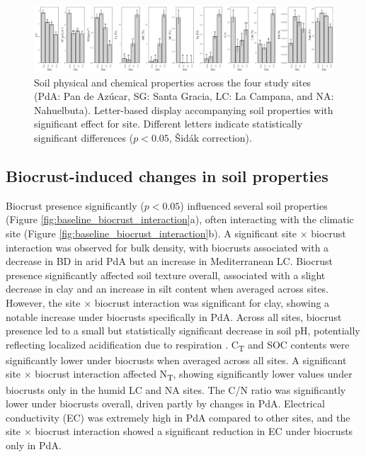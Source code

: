 \begin{figure}
    \centering
    \includegraphics[width=1\textwidth]{img/baseline_by_site.png}
    \caption[Soil physical and chemical properties across the four study sites]{Soil physical and chemical properties across the four study sites (PdA: Pan de Azúcar, SG: Santa Gracia, LC: La Campana, and NA: Nahuelbuta). Letter-based display accompanying soil properties with significant effect for site. Different letters indicate statistically significant differences ($p < 0.05$, Šidák correction).}
    \label{fig:baseline_site}
\end{figure}

\FloatBarrier

\subsection{Biocrust-induced changes in soil properties}
\label{sec:BicorustInducedSoil}

Biocrust presence significantly ($p < 0.05$) influenced several soil properties (Figure \ref{fig:baseline_biocrust_interaction}a), often interacting with the climatic site (Figure \ref{fig:baseline_biocrust_interaction}b). A significant site $\times$ biocrust interaction was observed for bulk density, with biocrusts associated with a decrease in BD in arid PdA but an increase in Mediterranean LC. Biocrust presence significantly affected soil texture overall, associated with a slight decrease in clay and an increase in silt content when averaged across sites. However, the site $\times$ biocrust interaction was significant for clay, showing a notable increase under biocrusts specifically in PdA. Across all sites, biocrust presence led to a small but statistically significant decrease in soil pH, potentially reflecting localized acidification due to respiration \citep{Bachar2010}. C\textsubscript{T} and SOC contents were significantly lower under biocrusts when averaged across all sites. A significant site $\times$ biocrust interaction affected N\textsubscript{T}, showing significantly lower values under biocrusts only in the humid LC and NA sites. The C/N ratio was significantly lower under biocrusts overall, driven partly by changes in PdA. Electrical conductivity (EC) was extremely high in PdA compared to other sites, and the site $\times$ biocrust interaction showed a significant reduction in EC under biocrusts only in PdA.


